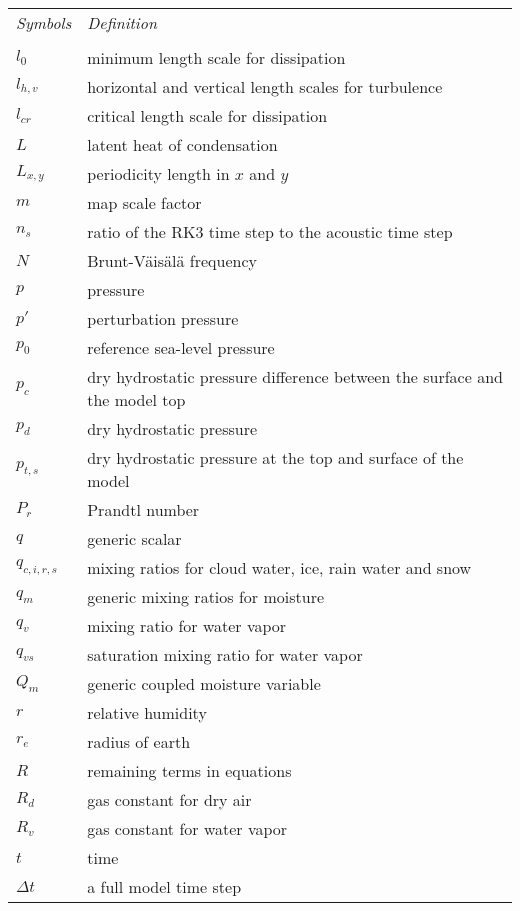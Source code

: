 \begin{tabular}{ l p{5.5in} }
{\em Symbols}  & {\em Definition} \\
\\
$l_0$          & minimum length scale for dissipation \\
$l_{h,v}$      & horizontal and vertical length scales for turbulence \\
$l_{cr}$       & critical length scale for dissipation \\
$L$            & latent heat of condensation \\
$L_{x,y}$      & periodicity length in $x$ and $y$ \\
$m$            & map scale factor \\ 
$n_s$          & ratio of the RK3 time step to the acoustic time step \\
$N$            & Brunt-V\"ais\"al\"a frequency \\
$p$            & pressure \\
$p'$           & perturbation pressure \\
$p_0$          & reference sea-level pressure \\
$p_c$        & dry hydrostatic pressure difference between the surface and the model top \\
$p_d$          & dry hydrostatic pressure \\
$p_{t,s}$  & dry hydrostatic pressure at the top and surface of the model \\
$P_r$          & Prandtl number \\
$q$            & generic scalar \\
$q_{c,i,r,s}$  & mixing ratios for cloud water, ice, rain water and snow \\
$q_m$          & generic mixing ratios for moisture \\
$q_v$          & mixing ratio for water vapor \\
$q_{vs}$       & saturation mixing ratio for water vapor \\
$Q_m$          & generic coupled moisture variable \\
$r$            & relative humidity   \\
$r_e$          & radius of earth \\
$R$            & remaining terms in equations  \\
$R_d$          & gas constant for dry air \\
$R_v$          & gas constant for water vapor \\
$t$            & time \\
$\Delta t$     & a full model time step \\

\end{tabular}
